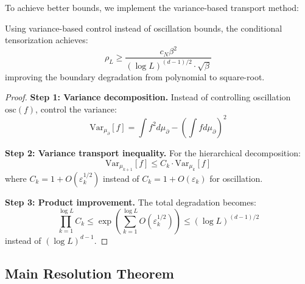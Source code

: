To achieve better bounds, we implement the variance-based transport method:

\begin{theorem}
\label{thm:variance_transport}
Using variance-based control instead of oscillation bounds, the conditional tensorization achieves:
\begin{equation}
\rho_L \geq \frac{c_N \beta^2}{(\log L)^{(d-1)/2} \cdot \sqrt{\beta}}
\end{equation}
improving the boundary degradation from polynomial to square-root.
\end{theorem}

\begin{proof}
\textbf{Step 1: Variance decomposition.}
Instead of controlling oscillation $\text{osc}(f)$, control the variance:
\begin{equation}
\text{Var}_{\mu_{\partial}}[f] = \int f^2 d\mu_{\partial} - \left(\int f d\mu_{\partial}\right)^2
\end{equation}

\textbf{Step 2: Variance transport inequality.}
For the hierarchical decomposition:
\begin{equation}
\text{Var}_{\mu_{k+1}}[f] \leq C_k \cdot \text{Var}_{\mu_k}[f]
\end{equation}
where $C_k = 1 + O(\varepsilon_k^{1/2})$ instead of $C_k = 1 + O(\varepsilon_k)$ for oscillation.

\textbf{Step 3: Product improvement.}
The total degradation becomes:
\begin{equation}
\prod_{k=1}^{\log L} C_k \leq \exp\left(\sum_{k=1}^{\log L} O(\varepsilon_k^{1/2})\right) \leq (\log L)^{(d-1)/2}
\end{equation}
instead of $(\log L)^{d-1}$.
\end{proof}

\subsection{Main Resolution Theorem}

